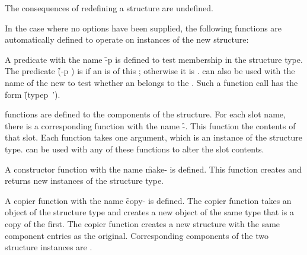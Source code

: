 The consequences of redefining a  structure are undefined.


In the case where no  options have been supplied, 
the following functions are automatically defined to operate 
on instances of the new structure:

\beginlist
{}

A predicate with the name \f{-p} is defined to
test membership in the structure type.  The predicate 
\f{(-p )} is  if an  
is of this ; otherwise it is .   can also
be used with the name of the new  to test whether an 
belongs to the . 
Such a function call has the form 
\hbox{\f{(typep  ')}}.


 functions are defined to  the components of the
structure.  For each slot name, there is a corresponding
 function with the name \f{-}.
This function  the contents of that slot.  
Each  function takes one argument, which is
an instance of the structure type.  
 can be used with any of these  functions
to alter the slot contents.


A constructor function with the name \f{make-}
is defined.  This function creates and returns new 
instances of the structure type.


A copier function with the name \f{copy-} is defined.
The copier function takes an object of the structure type and creates a
new object of the same  type that is a copy of the first.  The copier
function creates a new structure with the same component entries
as the original.  Corresponding components of the two structure instances
are .
\endlist


